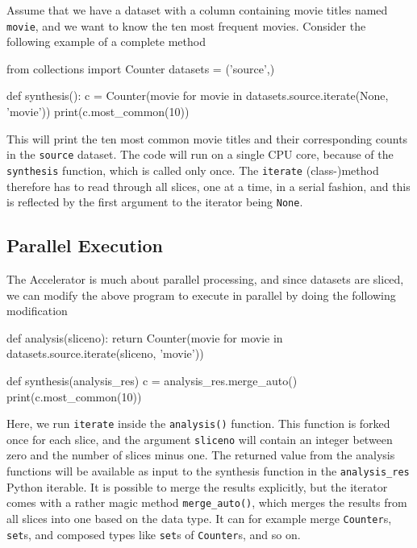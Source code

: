 Assume that we have a dataset with a column containing movie titles
named \texttt{movie}, and we want to know the ten most frequent
movies.  Consider the following example of a complete method
\begin{python}
from collections import Counter
datasets = ('source',)

def synthesis():
    c = Counter(movie for movie in datasets.source.iterate(None, 'movie'))
    print(c.most_common(10))
\end{python}
This will print the ten most common movie titles and their
corresponding counts in the \texttt{source} dataset.  The code will
run on a single CPU core, because of the \texttt{synthesis} function,
which is called only once.  The \texttt{iterate} (class-)method
therefore has to read through all slices, one at a time, in a serial
fashion, and this is reflected by the first argument to the iterator
being \texttt{None}.


\subsection{Parallel Execution}
The Accelerator is much about parallel processing, and since datasets
are sliced, we can modify the above program to execute in parallel by
doing the following modification
\begin{python}
def analysis(sliceno):
    return Counter(movie for movie in datasets.source.iterate(sliceno, 'movie'))

def synthesis(analysis_res)
    c = analysis_res.merge_auto()
    print(c.most_common(10))
\end{python}
Here, we run \texttt{iterate} inside the \texttt{analysis()} function.
This function is forked once for each slice, and the argument
\texttt{sliceno} will contain an integer between zero and the number
of slices minus one.  The returned value from the analysis functions
will be available as input to the synthesis function in the
\texttt{analysis\_res} Python iterable.  It is possible to merge the
results explicitly, but the iterator comes with a rather magic method
\texttt{merge\_auto()}, which merges the results from all slices into
one based on the data type.  It can for example merge
\texttt{Counter}s, \texttt{set}s, and composed types like
\texttt{set}s of \texttt{Counter}s, and so on.


